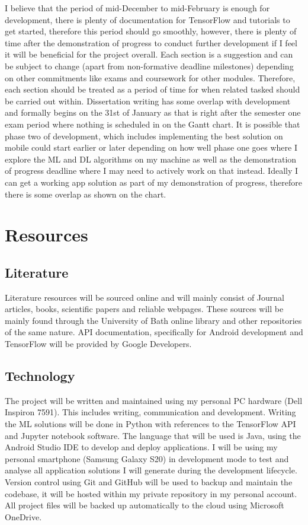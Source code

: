 \documentclass{article}
\begin{document}
I believe that the period of mid-December to mid-February is enough for development, there is plenty of documentation for TensorFlow and tutorials to get started, therefore this period should go smoothly, however, there is plenty of time after the demonstration of progress to conduct further development if I feel it will be beneficial for the project overall. Each section is a suggestion and can be subject to change (apart from non-formative deadline milestones) depending on other commitments like exams and coursework for other modules. Therefore, each section should be treated as a period of time for when related tasked should be carried out within. Dissertation writing has some overlap with development and formally begins on the 31st of January as that is right after the semester one exam period where nothing is scheduled in on the Gantt chart. It is possible that phase two of development, which includes implementing the best solution on mobile could start earlier or later depending on how well phase one goes where I explore the ML and DL algorithms on my machine as well as the demonstration of progress deadline where I may need to actively work on that instead. Ideally I can get a working app solution as part of my demonstration of progress, therefore there is some overlap as shown on the chart.
\section{Resources}
\subsection{Literature}
Literature resources will be sourced online and will mainly consist of Journal articles, books, scientific papers and reliable webpages. These sources will be mainly found through the University of Bath online library and other repositories of the same nature.
API documentation, specifically for Android development and TensorFlow will be provided by Google Developers.
\subsection{Technology}
The project will be written and maintained using my personal PC hardware (Dell Inspiron 7591). This includes writing, communication and development. Writing the ML solutions will be done in Python with references to the TensorFlow API and Jupyter notebook software. The language that will be used is Java, using the Android Studio IDE to develop and deploy applications. I will be using my personal smartphone (Samsung Galaxy S20) in development mode to test and analyse all application solutions I will generate during the development lifecycle. Version control using Git and GitHub will be used to backup and maintain the codebase, it will be hosted within my private repository in my personal account. All project files will be backed up automatically to the cloud using Microsoft OneDrive.
\end{document}
